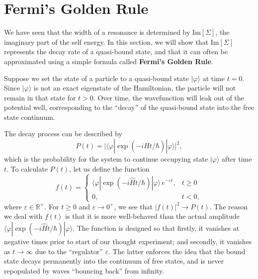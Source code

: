 \documentclass[pra,12pt]{revtex4}
\begin{document}
\section{Fermi's Golden Rule}
\label{sec:goldenrule}

We have seen that the width of a resonance is determined by
$\mathrm{Im}[\Sigma]$, the imaginary part of the self energy.  In this
section, we will show that $\mathrm{Im}[\Sigma]$ represents the decay
rate of a quasi-bound state, and that it can often be approximated
using a simple formula called \textbf{Fermi's Golden Rule}.

Suppose we set the state of a particle to a quasi-bound state
$|\varphi\rangle$ at time $t = 0$.  Since $|\varphi\rangle$ is not an
exact eigenstate of the Hamiltonian, the particle will not remain in
that state for $t > 0$.  Over time, the wavefunction will leak out of
the potential well, corresponding to the ``decay'' of the quasi-bound
state into the free state continuum.

The decay process can be described by
\begin{equation}
  P(t) = \Big|\langle\varphi|\exp\left(-i\hat{H}t/\hbar\right)|\varphi\rangle\Big|^2,
\end{equation}
which is the probability for the system to continue occupying state
$|\varphi\rangle$ after time $t$.  To calculate $P(t)$, let us define
the function
\begin{equation}
  f(t) = \begin{cases} \langle\varphi|\exp\left(-i\hat{H}t/\hbar\right)|\varphi\rangle \,e^{-\varepsilon t}, & t \ge 0 \\ 0, & t < 0,\end{cases}
\end{equation}
where $\varepsilon \in \mathbb{R}^+$.  For $t \ge 0$ and $\varepsilon
\rightarrow 0^+$, we see that $|f(t)|^2 \rightarrow P(t)$.  The reason
we deal with $f(t)$ is that it is more well-behaved than the actual
amplitude $\langle\varphi|\exp(-i\hat{H}t/\hbar)|\varphi\rangle$.  The
function is designed so that firstly, it vanishes at negative times
prior to start of our thought experiment; and secondly, it vanishes as
$t\rightarrow\infty$ due to the ``regulator'' $\varepsilon$.  The
latter enforces the idea that the bound state decays permanently into
the continuum of free states, and is never repopulated by waves
``bouncing back'' from infinity.
\end{document}
